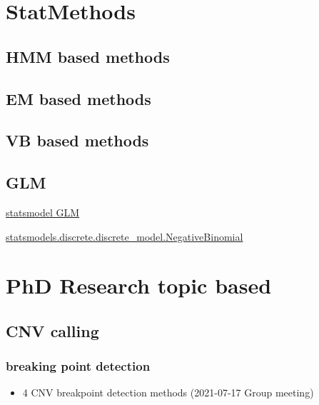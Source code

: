 \documentclass[
]{book}
\providecommand{\tightlist}{%
  \setlength{\itemsep}{0pt}\setlength{\parskip}{0pt}}
\begin{document}
\hypertarget{statmethods}{%
\chapter{StatMethods}\label{statmethods}}

\hypertarget{hmm-based-methods}{%
\section{HMM based methods}\label{hmm-based-methods}}

\hypertarget{em-based-methods}{%
\section{EM based methods}\label{em-based-methods}}

\hypertarget{vb-based-methods}{%
\section{VB based methods}\label{vb-based-methods}}

\hypertarget{glm}{%
\section{GLM}\label{glm}}

\href{https://www.statsmodels.org/stable/glm.html\#links}{statsmodel GLM}

\href{https://www.statsmodels.org/stable/generated/statsmodels.discrete.discrete_model.NegativeBinomial.html}{statsmodels.discrete.discrete\_model.NegativeBinomial}

\hypertarget{phd-research-topic-based}{%
\chapter{PhD Research topic based}\label{phd-research-topic-based}}

\hypertarget{cnv-calling}{%
\section{CNV calling}\label{cnv-calling}}

\hypertarget{breaking-point-detection}{%
\subsection{breaking point detection}\label{breaking-point-detection}}

\begin{itemize}
\tightlist
\item
  4 CNV breakpoint detection methods (2021-07-17 Group meeting)
\end{itemize}
\end{document}

